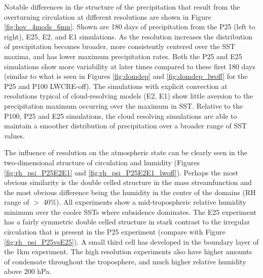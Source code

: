 \documentclass[draft]{agujournal2019}
\begin{document}
{Notable differences in the structure of the precipitation that result from the overturning circulation at different resolutions are shown in Figure \ref{fig:hov_4mods_6mn}.  
Shown are 180 days of precipitation from the P25 (left to right), E25, E2, and E1 simulations.  
As the resolution increases the distribution of precipitation becomes broader, more consistently centered over the SST maxima, and has 
lower maximum precipitation rates.  
Both the P25 and E25 simulations show more variability at later times compared to these 
first 180 days (similar to what is seen in Figures \ref{fig:domdep}  and \ref{fig:domdep_lwoff} for the P25 and P100 LWCRE-off).  
The simulations with explicit convection at resolutions typical of cloud-resolving models 
(E2, E1) show little aversion to the precipitation maximum occurring over the maximum in SST.
Relative to the P100, P25 and E25 simulations, the cloud resolving simulations are able to maintain a smoother distribution of 
precipitation over a broader range of SST values.    

The influence of resolution on the atmospheric state can be clearly seen in the two-dimensional structure 
of circulation and humidity (Figures \ref{fig:rh_psi_P25E2E1} and \ref{fig:rh_psi_P25E2E1_lwoff}).
Perhaps the most obvious similarity is the double celled structure in the mass streamfunction and the most 
obvious difference being the humidity in the center of the domains (RH range of $>$ 40\%). %
All experiments show a mid-tropospheric relative humidity minimum over the cooler SSTs where subsidence 
dominates.  The E25 experiment has a fairly symmetric double celled structure in stark contrast to the irregular circulation 
that is present in the P25 experiment (compare with Figure \ref{fig:rh_psi_P25vsE25}). 
A small third cell has developed in the boundary layer of the 1km experiment.   The high resolution experiments also have 
higher amounts of condensate throughout the troposphere, and much higher relative humidity 
above 200 hPa. 


}
\end{document}
